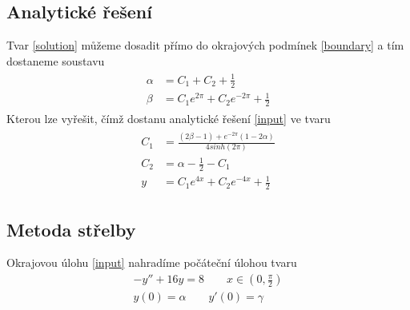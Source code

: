 \documentclass[a4paper]{article}
\begin{document}
\subsection*{Analytické řešení}
Tvar \eqref{solution} můžeme dosadit přímo do okrajových podmínek \eqref{boundary} a tím dostaneme soustavu
\begin{align}
	\begin{split}
		\alpha &= C_1 + C_2 + \frac{1}{2} \\
		\beta &= C_1 e^{ 2 \pi } + C_2 e^{ -2 \pi } + \frac{1}{2}
	\end{split}
\end{align}
Kterou lze vyřešit, čímž dostanu analytické řešení \eqref{input} ve tvaru
\begin{align}
	\begin{split}
		C_1 &= \frac{\left( 2 \beta - 1 \right) + e^{ -2 \pi } \left( 1 - 2 \alpha \right)}{4 sinh \left( 2 \pi \right)} \\
		C_2 &= \alpha - \frac{1}{2} - C_1 \\
		y &= C_1 e^{ 4x } + C_2 e^{ -4x } + \frac{1}{2}
	\end{split}
\end{align}

\subsection*{Metoda střelby}
Okrajovou úlohu \eqref{input} nahradíme počáteční úlohou tvaru
\begin{subequations}\label{shoot}
	\begin{align}
		-y'' + 16y = 8 \qquad x \in \left( 0, \frac{\pi}{2} \right) \\
		y \left( 0 \right) = \alpha \qquad y' \left( 0 \right) = \gamma
	\end{align}
\end{subequations}
\end{document}
